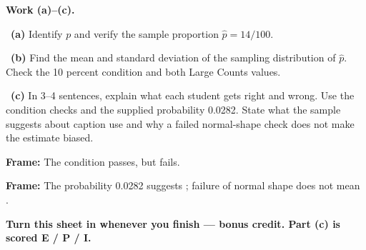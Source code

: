 \documentclass[11pt]{article}
\begin{document}
\newpage
\textbf{Work (a)--(c).}\par\smallskip

~\textbf{(a)} Identify $p$ and verify the sample proportion $\widehat p=14/100$.\par
\workspace{0.8in}

~\textbf{(b)} Find the mean and standard deviation of the sampling distribution of $\widehat p$. Check the 10 percent condition and both Large Counts values.\par
\workspace{1.4in}

~\textbf{(c)} In 3--4 sentences, explain what each student gets right and wrong. Use the condition checks and the supplied probability 0.0282. State what the sample suggests about caption use and why a failed normal-shape check does not make the estimate biased.\par
\workspace{2.0in}

\begin{sentenceframebox}\raggedright\textbf{Frame:} The condition \blank[1.1in] passes, but \blank[1.3in] fails.\end{sentenceframebox}

\begin{sentenceframebox}\raggedright\textbf{Frame:} The probability 0.0282 suggests \blank[2.1in]; failure of normal shape does not mean \blank[2.1in].\end{sentenceframebox}

\textbf{Turn this sheet in whenever you finish --- bonus credit. Part (c) is scored E / P / I.}\par
\end{document}
